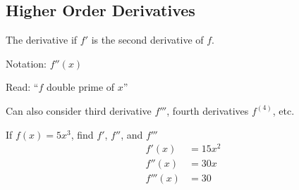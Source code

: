 \subsection{Higher Order Derivatives}
\begin{definition}
    The derivative if $f'$ is the second derivative of $f$.

    \quad Notation: $f''(x)$

    \quad Read: ``$f$ double prime of $x$''

    \quad Can also consider third derivative $f'''$, fourth derivatives $f^{(4)}$, etc.
\end{definition}
\begin{example}
    If $f(x) = 5x^3$, find $f'$, $f''$, and $f'''$
    \begin{align*}
        f'(x) &= 15x^2 \\
        f''(x) &= 30x \\
        f'''(x) &= 30
    \end{align*}
\end{example}
